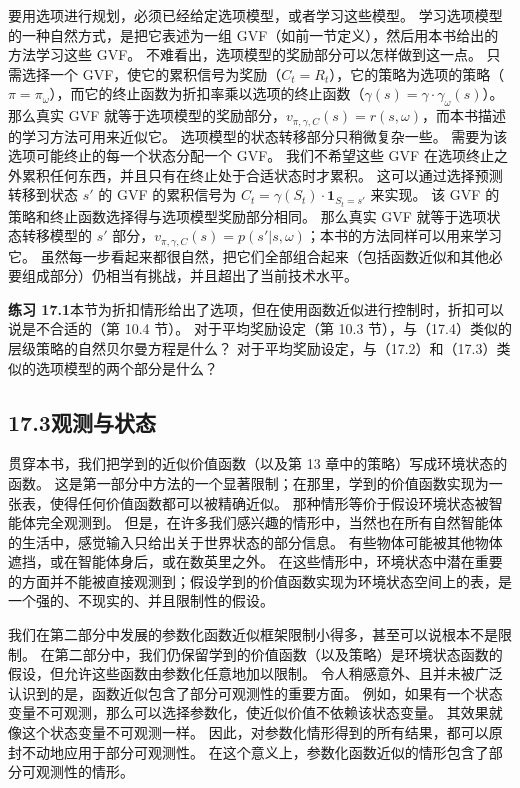 \documentclass[UTF8,12pt,a4paper,fontset=fandol]{ctexart}
\begin{document}
要用选项进行规划，必须已经给定选项模型，或者学习这些模型。
学习选项模型的一种自然方式，是把它表述为一组 GVF（如前一节定义），然后用本书给出的方法学习这些 GVF。
不难看出，选项模型的奖励部分可以怎样做到这一点。
只需选择一个 GVF，使它的累积信号为奖励（$C_t=R_t$），它的策略为选项的策略（$\pi=\pi_\omega$），而它的终止函数为折扣率乘以选项的终止函数（$\gamma(s)=\gamma\cdot\gamma_\omega(s)$）。
那么真实 GVF 就等于选项模型的奖励部分，$v_{\pi,\gamma,C}(s)=r(s,\omega)$，而本书描述的学习方法可用来近似它。
选项模型的状态转移部分只稍微复杂一些。
需要为该选项可能终止的每一个状态分配一个 GVF。
我们不希望这些 GVF 在选项终止之外累积任何东西，并且只有在终止处于合适状态时才累积。
这可以通过选择预测转移到状态 $s'$ 的 GVF 的累积信号为 $C_t=\gamma(S_t)\cdot\mathbf{1}_{S_t=s'}$ 来实现。
该 GVF 的策略和终止函数选择得与选项模型奖励部分相同。
那么真实 GVF 就等于选项状态转移模型的 $s'$ 部分，$v_{\pi,\gamma,C}(s)=p(s'|s,\omega)$；本书的方法同样可以用来学习它。
虽然每一步看起来都很自然，把它们全部组合起来（包括函数近似和其他必要组成部分）仍相当有挑战，并且超出了当前技术水平。

\noindent\textbf{练习 17.1}\quad 本节为折扣情形给出了选项，但在使用函数近似进行控制时，折扣可以说是不合适的（第 10.4 节）。
对于平均奖励设定（第 10.3 节），与（17.4）类似的层级策略的自然贝尔曼方程是什么？
对于平均奖励设定，与（17.2）和（17.3）类似的选项模型的两个部分是什么？

\subsection*{17.3\quad 观测与状态}

贯穿本书，我们把学到的近似价值函数（以及第 13 章中的策略）写成环境状态的函数。
这是第一部分中方法的一个显著限制；在那里，学到的价值函数实现为一张表，使得任何价值函数都可以被精确近似。
那种情形等价于假设环境状态被智能体完全观测到。
但是，在许多我们感兴趣的情形中，当然也在所有自然智能体的生活中，感觉输入只给出关于世界状态的部分信息。
有些物体可能被其他物体遮挡，或在智能体身后，或在数英里之外。
在这些情形中，环境状态中潜在重要的方面并不能被直接观测到；假设学到的价值函数实现为环境状态空间上的表，是一个强的、不现实的、并且限制性的假设。

我们在第二部分中发展的参数化函数近似框架限制小得多，甚至可以说根本不是限制。
在第二部分中，我们仍保留学到的价值函数（以及策略）是环境状态函数的假设，但允许这些函数由参数化任意地加以限制。
令人稍感意外、且并未被广泛认识到的是，函数近似包含了部分可观测性的重要方面。
例如，如果有一个状态变量不可观测，那么可以选择参数化，使近似价值不依赖该状态变量。
其效果就像这个状态变量不可观测一样。
因此，对参数化情形得到的所有结果，都可以原封不动地应用于部分可观测性。
在这个意义上，参数化函数近似的情形包含了部分可观测性的情形。
\end{document}
